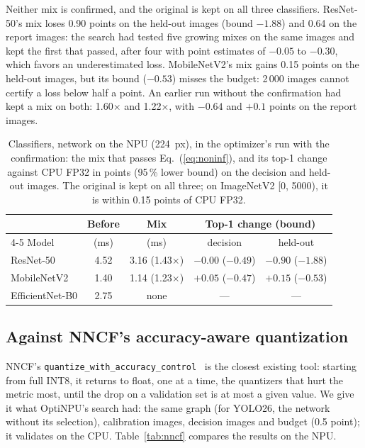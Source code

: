 \documentclass[conference]{IEEEtran}
\newcommand{\tool}{OptiNPU}
\begin{document}
Neither mix is confirmed, and the original is kept on all three classifiers. ResNet-50's mix loses 0.90 points on the held-out images (bound $-1.88$) and 0.64 on the report images: the search had tested five growing mixes on the same images and kept the first that passed, after four with point estimates of $-0.05$ to $-0.30$, which favors an underestimated loss. MobileNetV2's mix gains 0.15 points on the held-out images, but its bound ($-0.53$) misses the budget: 2\,000 images cannot certify a loss below half a point. An earlier run without the confirmation had kept a mix on both: 1.60$\times$ and 1.22$\times$, with $-0.64$ and $+0.1$ points on the report images.

\begin{table}[t]
\caption{Classifiers, network on the NPU (224~px), in the optimizer's run with the confirmation: the mix that passes Eq.~(\ref{eq:noninf}), and its top-1 change against CPU FP32 in points (95\,\% lower bound) on the decision and held-out images. The original is kept on all three; on ImageNetV2 [0, 5000), it is within 0.15 points of CPU FP32.}
\label{tab:classifiers}
\centering
\footnotesize
\setlength{\tabcolsep}{3pt}
\begin{tabular}{@{}lcccc@{}}
\toprule
& Before & Mix & \multicolumn{2}{c}{Top-1 change (bound)} \\
\cmidrule(l){4-5}
Model & (ms) & (ms) & decision & held-out \\
\midrule
ResNet-50 & 4.52 & 3.16 (1.43$\times$) & $-0.00$ ($-0.49$) & $-0.90$ ($-1.88$) \\
MobileNetV2 & 1.40 & 1.14 (1.23$\times$) & $+0.05$ ($-0.47$) & $+0.15$ ($-0.53$) \\
EfficientNet-B0 & 2.75 & none & --- & --- \\
\bottomrule
\end{tabular}
\end{table}

\subsection{Against NNCF's accuracy-aware quantization}
\label{sec:eval-nncf}

NNCF's \texttt{quantize\_with\_accuracy\_control}~\cite{kozlov2020nncf} is the closest existing tool: starting from full INT8, it returns to float, one at a time, the quantizers that hurt the metric most, until the drop on a validation set is at most a given value. We give it what \tool{}'s search had: the same graph (for YOLO26, the network without its selection), calibration images, decision images and budget (0.5 point); it validates on the CPU. Table~\ref{tab:nncf} compares the results on the NPU.
\end{document}
